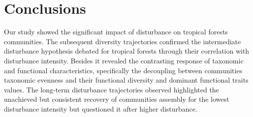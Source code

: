 \documentclass[fleqn,10pt]{ArtEcoFoG} %
\theoremstyle{definition}
\theoremstyle{definition}
\theoremstyle{definition}
\theoremstyle{remark}
\begin{document}
\section{Conclusions}\label{conclusions}

Our study showed the significant impact of disturbance on tropical
forests communities. The subsequent diversity trajectories confirmed the
intermediate disturbance hypothesis debated for tropical forests through
their correlation with disturbance intensity. Besides it revealed the
contrasting response of taxonomic and functional characteristics,
specifically the decoupling between communities taxonomic evenness and
their functional diversity and dominant functional traits values. The
long-term disturbance trajectories observed highlighted the unachieved
but consistent recovery of communities assembly for the lowest
disturbance intensity but questioned it after higher disturbance.





\end{document}
